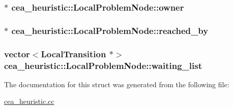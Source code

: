 \hypertarget{structcea__heuristic_1_1LocalProblemNode_a63f142db9eae0ad7226e7762d012970d}{
\subsubsection[{owner}]{$\ast$ cea\-\_\-heuristic\-::\-Local\-Problem\-Node\-::owner}}\label{structcea__heuristic_1_1LocalProblemNode_a63f142db9eae0ad7226e7762d012970d}
\hypertarget{structcea__heuristic_1_1LocalProblemNode_ada7afd34f822d710322eb02cf9d0a956}{
\subsubsection[{reached\-\_\-by}]{$\ast$ cea\-\_\-heuristic\-::\-Local\-Problem\-Node\-::reached\-\_\-by}}\label{structcea__heuristic_1_1LocalProblemNode_ada7afd34f822d710322eb02cf9d0a956}
\hypertarget{structcea__heuristic_1_1LocalProblemNode_a81a3b7e46a45f6fe5eac9cae61846644}{
\subsubsection[{waiting\-\_\-list}]{\setlength{\rightskip}{0pt plus 5cm}vector$<${\bf Local\-Transition} $\ast$$>$ cea\-\_\-heuristic\-::\-Local\-Problem\-Node\-::waiting\-\_\-list}}\label{structcea__heuristic_1_1LocalProblemNode_a81a3b7e46a45f6fe5eac9cae61846644}


The documentation for this struct was generated from the following file\-:\begin{DoxyCompactItemize}
\item 
\hyperlink{cea__heuristic_8cc}{cea\-\_\-heuristic.\-cc}\end{DoxyCompactItemize}
